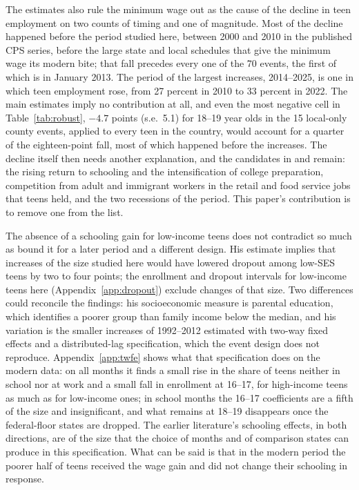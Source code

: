 \documentclass[12pt]{article}
\begin{document}
The estimates also rule the minimum wage out as the cause of the decline in teen employment on two counts of timing and one of magnitude. Most of the decline happened before the period studied here, between 2000 and 2010 in the published CPS series, before the large state and local schedules that give the minimum wage its modern bite; that fall precedes every one of the 70 events, the first of which is in January 2013. The period of the largest increases, 2014--2025, is one in which teen employment rose, from 27 percent in 2010 to 33 percent in 2022. The main estimates imply no contribution at all, and even the most negative cell in Table~\ref{tab:robust}, $-4.7$ points (s.e.\ 5.1) for 18--19 year olds in the 15 local-only county events, applied to every teen in the country, would account for a quarter of the eighteen-point fall, most of which happened before the increases. The decline itself then needs another explanation, and the candidates in \citet{neumark2019} and \citet{smith2011,smith2012} remain: the rising return to schooling and the intensification of college preparation, competition from adult and immigrant workers in the retail and food service jobs that teens held, and the two recessions of the period. This paper's contribution is to remove one from the list.

The absence of a schooling gain for low-income teens does not contradict \citet{smith2021} so much as bound it for a later period and a different design. His estimate implies that increases of the size studied here would have lowered dropout among low-SES teens by two to four points; the enrollment and dropout intervals for low-income teens here (Appendix~\ref{app:dropout}) exclude changes of that size. Two differences could reconcile the findings: his socioeconomic measure is parental education, which identifies a poorer group than family income below the median, and his variation is the smaller increases of 1992--2012 estimated with two-way fixed effects and a distributed-lag specification, which the event design does not reproduce. Appendix~\ref{app:twfe} shows what that specification does on the modern data: on all months it finds a small rise in the share of teens neither in school nor at work and a small fall in enrollment at 16--17, for high-income teens as much as for low-income ones; in school months the 16--17 coefficients are a fifth of the size and insignificant, and what remains at 18--19 disappears once the federal-floor states are dropped. The earlier literature's schooling effects, in both directions, are of the size that the choice of months and of comparison states can produce in this specification. What can be said is that in the modern period the poorer half of teens received the wage gain and did not change their schooling in response.
\end{document}
